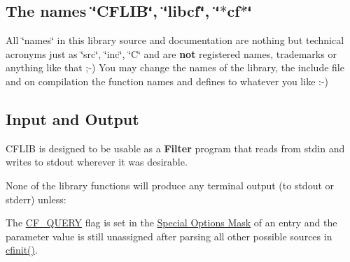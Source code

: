 \hypertarget{properties_names}{}\subsection{The names \char`\"{}\-C\-F\-L\-I\-B\char`\"{}, \char`\"{}libcf\char`\"{}, \char`\"{}$\ast$cf$\ast$\char`\"{}}\label{properties_names}
All \char`\"{}names\char`\"{} in this library source and documentation are nothing but technical acronyms just as \char`\"{}src\char`\"{}, \char`\"{}inc\char`\"{}, \char`\"{}\-C\char`\"{} and are {\bfseries not} registered names, trademarks or anything like that ;-\/) You may change the names of the library, the include file and on compilation the function names and defines to whatever you like \-:-\/)\hypertarget{properties_io}{}\subsection{Input and Output}\label{properties_io}
C\-F\-L\-I\-B is designed to be usable as a {\bfseries Filter} program that reads from {\ttfamily stdin} and writes to {\ttfamily stdout} wherever it was desirable.

None of the library functions will produce any terminal output (to {\ttfamily stdout} or {\ttfamily stderr}) unless\-:


\begin{DoxyItemize}
\item The \hyperlink{group__special__options__mask_gae39e0d9b4e9af8c6d4b3676783dd26e0}{C\-F\-\_\-\-Q\-U\-E\-R\-Y} flag is set in the \hyperlink{group__special__options__mask}{Special Options Mask} of an entry and the parameter value is still unassigned after parsing all other possible sources in \hyperlink{group__cflib__core_ga64fb341565c2ddfccd6669e5e6265a8a}{cfinit()}.
\end{DoxyItemize}


